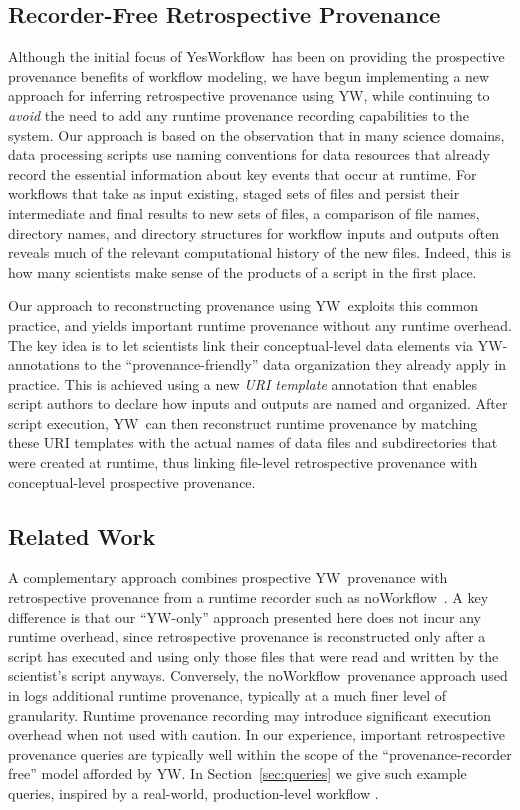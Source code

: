 \documentclass[letterpaper,twocolumn,10pt]{article}
\newcommand{\NW}{\textsf{noWorkflow}}
\newcommand{\YW}{\textsf{YesWorkflow}}
\newcommand{\yw}{\textsf{YW}}
\begin{document}
\subsection*{Recorder-Free Retrospective Provenance} 
Although the initial focus of \YW\ has been on providing the
prospective provenance benefits of %
workflow modeling, we have begun implementing a new approach for
inferring retrospective provenance using \yw, while continuing to
\emph{avoid} the need to add any runtime provenance recording
capabilities to the system. Our approach is based on the observation
that in many science domains, data processing scripts use naming
conventions for data resources that already record the essential
information about key events that occur at runtime. For workflows that
take as input existing, staged sets of files and persist their
intermediate and final results to new sets of files, a comparison of
file names, directory names, and directory structures for workflow
inputs and outputs often reveals much of the relevant computational
history of the new files. Indeed, this is how many scientists make
sense of the products of a script in the first place.

Our approach to reconstructing provenance using \yw\ exploits this
common practice, and yields important runtime provenance without any
runtime overhead. The key idea is to let scientists link their
conceptual-level data elements via \yw-annotations to the
``provenance-friendly'' data organization they already apply in
practice. This is achieved using a new \emph{URI template} annotation
that enables script authors to declare how inputs and outputs are
named and organized. After script execution, \yw\ can then reconstruct
runtime provenance by matching these URI templates with the actual
names of data files and subdirectories that were created at runtime,
thus linking file-level retrospective provenance with conceptual-level
prospective provenance.

\subsection*{Related Work}
A complementary approach \cite{dey15} combines prospective \yw\
provenance with retrospective provenance from a runtime recorder such
as \NW\ \cite{murta2014nw}. A key difference is that our ``\yw-only''
approach presented here does not incur any runtime overhead, since
retrospective provenance is reconstructed only after a script has
executed and using only those files that were read and written by the
scientist's script anyways. Conversely, the \NW\ provenance approach
used in \cite{dey15} logs additional runtime provenance, typically at
a much finer level of granularity. Runtime provenance recording may
introduce significant execution overhead when not used with
caution. In our experience, important retrospective provenance queries
are typically well within the scope of the ``provenance-recorder
free'' model afforded by \yw.  In Section~\ref{sec:queries} we give
such example queries, inspired by a real-world, production-level
workflow \cite{tsai2013autodrug}.
\end{document}
